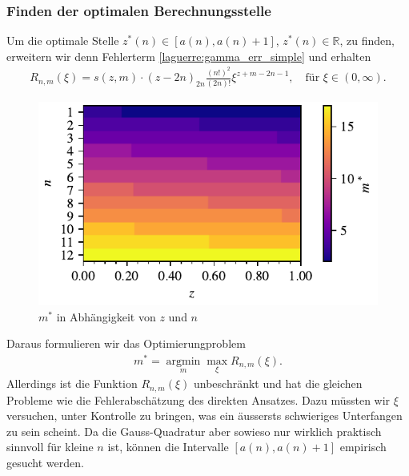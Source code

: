 \subsubsection{Finden der optimalen Berechnungsstelle}
Um die optimale Stelle $z^*(n) \in \left[a(n), a(n) + 1\right]$,
$z^*(n) \in \mathbb{R}$,
zu finden,
erweitern wir denn Fehlerterm \eqref{laguerre:gamma_err_simple}
und erhalten
\begin{align}
R_{n,m}(\xi)
=
s(z, m) \cdot (z - 2n)_{2n} \frac{(n!)^2}{(2n)!} \xi^{z + m - 2n - 1}
,\quad
\text{für }
\xi \in (0, \infty)
\label{laguerre:gamma_err_shifted}
.
\end{align}
%
\begin{figure}
\centering
\includegraphics{papers/laguerre/images/targets.pdf}
\caption{$m^*$ in Abhängigkeit von $z$ und $n$}
\label{laguerre:fig:targets}
\end{figure}
%
Daraus formulieren wir das Optimierungproblem
\begin{align*}
m^*
=
\operatorname*{argmin}_m \max_\xi R_{n,m}(\xi)
.
\end{align*}
Allerdings ist die Funktion $R_{n,m}(\xi)$ unbeschränkt und
hat die gleichen Probleme wie die Fehlerabschätzung des direkten Ansatzes.
Dazu müssten wir $\xi$ versuchen,
unter Kontrolle zu bringen,
was ein äussersts schwieriges Unterfangen zu sein scheint.
Da die Gauss-Quadratur aber sowieso
nur wirklich praktisch sinnvoll für kleine $n$ ist,
können die Intervalle $[a(n), a(n)+1]$ empirisch gesucht werden.

